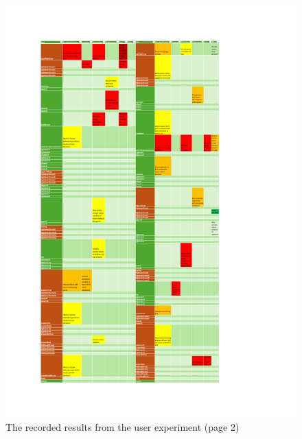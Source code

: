 \documentclass{l4proj}
\begin{document}
\begin{appendices}
\begin{figure}
    \centering
    \includegraphics[width=1\linewidth]{dissertation//images/results2.pdf}
    \caption{The recorded results from the user experiment (page 2)}
\end{figure}


\end{appendices}
\end{document}
